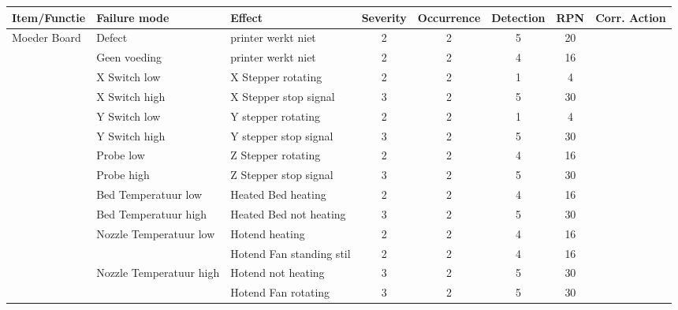 \documentclass{article}
\begin{document}
\begin{landscape}
\begin{longtable}{|l|l|l|c|c|c|c|l|}
        \newpage
        \hline
        \textbf{Item/Functie} & \textbf{Failure mode} & \textbf{Effect} & \textbf{Severity} & \textbf{Occurrence} & \textbf{Detection} & \textbf{RPN} & \textbf{Corr. Action} \\ \hline
        \multirow{15}{*}{Moeder Board}      & Defect                    & printer werkt niet        & 2 & 2 & 5 & 20 & \\
                                            & Geen voeding              & printer werkt niet        & 2 & 2 & 4 & 16 & \\
                                            & X Switch low              & X Stepper rotating        & 2 & 2 & 1 &  4 & \\
                                            & X Switch high             & X Stepper stop signal     & 3 & 2 & 5 & 30 & \\
                                            & Y Switch low              & Y stepper rotating        & 2 & 2 & 1 &  4 & \\
                                            & Y Switch high             & Y stepper stop signal     & 3 & 2 & 5 & 30 & \\
                                            & Probe low                 & Z Stepper rotating        & 2 & 2 & 4 & 16 & \\
                                            & Probe high                & Z Stepper stop signal     & 3 & 2 & 5 & 30 & \\
                                            & Bed Temperatuur low       & Heated Bed heating        & 2 & 2 & 4 & 16 & \\
                                            & Bed Temperatuur high      & Heated Bed not heating    & 3 & 2 & 5 & 30 & \\
                                            & \multirow{2}{*}{Nozzle Temperatuur low}    & Hotend heating            & 2 & 2 & 4 & 16 & \\
                                            &                                            & Hotend Fan standing stil  & 2 & 2 & 4 & 16 & \\
                                            & \multirow{2}{*}{Nozzle Temperatuur high}   & Hotend not heating        & 3 & 2 & 5 & 30 & \\
                                            &                                            & Hotend Fan rotating       & 3 & 2 & 5 & 30 & \\
                                            \hline

\end{longtable}
\end{landscape}
\end{document}
